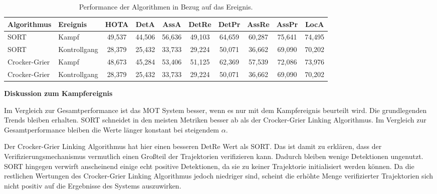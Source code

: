 
\begin{table}[htbp]
\centering
\caption{Performance der Algorithmen in Bezug auf das Ereignis.}
\label{tab:HOTAübersEreig}
\begin{tabular}{
  l
  l
  S[table-format=2.3]
  S[table-format=2.3]
  S[table-format=2.3]
  S[table-format=2.3]
  S[table-format=2.3]
  S[table-format=2.3]
  S[table-format=2.3]
  S[table-format=2.3]
}
\toprule
{Algorithmus} & {Ereignis} & {HOTA} & {DetA} & {AssA} & {DetRe} & {DetPr} & {AssRe} & {AssPr} & {LocA} \\
\midrule
SORT          & Kampf      & 49,537 & 44,506 & 56,636 & 49,103  & 64,659  & 60,287  & 75,641  & 74,495 \\
SORT          & Kontrollgang & 28,379 & 25,432 & 33,733 & 29,224  & 50,071  & 36,662  & 69,090  & 70,202 \\
Crocker-Grier & Kampf      & 48,673 & 45,284 & 53,406 & 51,125  & 62,369  & 57,539  & 72,086  & 73,976 \\
Crocker-Grier & Kontrollgang & 28,379 & 25,432 & 33,733 & 29,224  & 50,071  & 36,662  & 69,090  & 70,202 \\
\bottomrule
\end{tabular}
\end{table}

\textbf{Diskussion zum Kampfereignis}\par
Im Vergleich zur Gesamtperformance ist das MOT System besser, wenn es nur mit dem Kampfereignis beurteilt wird. Die grundlegenden Trends bleiben erhalten. SORT schneidet in den meisten Metriken besser ab als der Crocker-Grier Linking Algorithmus. Im Vergleich zur Gesamtperformance bleiben die Werte länger konstant bei steigendem \(\alpha\). \par

Der Crocker-Grier Linking Algorithmus hat hier einen besseren DetRe Wert als SORT. Das ist damit zu erklären, dass der Verifizierungsmechanismus vermutlich einen Großteil der Trajektorien verifizieren kann. Dadurch bleiben wenige Detektionen ungenutzt. SORT hingegen verwirft anscheinend einige echt positive Detektionen, da sie zu keiner Trajektorie initialisiert werden können. Da die restlichen Wertungen des Crocker-Grier Linking Algorithmus jedoch niedriger sind, scheint die erhöhte Menge verifizierter Trajektorien sich nicht positiv auf die Ergebnisse des Systems auszuwirken.\dubpar  


